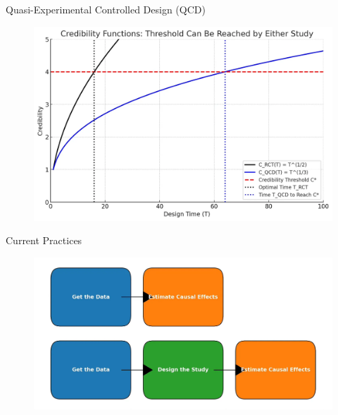 \documentclass{beamer}
\begin{document}
\begin{frame}{Quasi-Experimental Controlled Design (QCD)}
 
\begin{figure}
    \centering
    \includegraphics[width=\textwidth]{./lecture_includes/qcd}
\end{figure}

\end{frame}









\begin{frame}{Current Practices}
 
\begin{figure}
    \centering
    \includegraphics[width=\textwidth]{./lecture_includes/design_stage}
\end{figure}

\end{frame}
\end{document}
